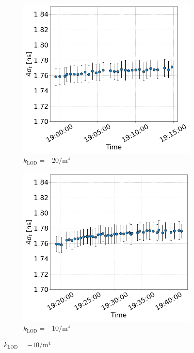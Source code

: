 \begin{figure}[htp]
\begin{subfigure}{.4\textwidth}
        \includegraphics[width=.95\linewidth]{images/app_c/bunch_length_cc_md_sep_coast7.png}  
        \caption{$k_\mathrm{LOD}=-20 \mathrm{/m^{4}}$}
    \end{subfigure}
    \begin{subfigure}{.4\textwidth}
        \centering
        \includegraphics[width=.95\linewidth]{images/app_c/bunch_length_cc_md_sep_coast8.png}  
        \caption{$k_\mathrm{LOD}=-10 \mathrm{/m^{4}}$}

\end{subfigure}
\end{figure}
